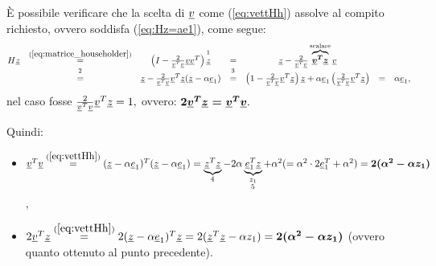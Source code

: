 È possibile verificare che la scelta di $\uline v$ come (\ref{eq:vettHh}) assolve al compito richiesto, ovvero soddisfa (\ref{eq:Hz=ae1}), come segue:
\begin{equation*}
    \begin{matrix}
        H\uline z &\overset{(\ref{eq:matrice_householder})}{=}&\left(I-\frac{2}{\uline v^T\uline v}\uline v\uline v^T\right)\overset{\footnotemark}{\uline z}&=&\uline z - \frac{2}{\uline v^T\uline v}\overbrace{\boldsymbol{\uline v^T\uline z}}^{\text{scalare}}\uline v\\
        &\overset{\footnotemark}{=}& \uline z - \frac{2}{\uline v^T\uline v}\uline v^T\uline z(\uline z - \alpha \uline e_1) &\overset{\footnotemark}{=}& \left(1 - \frac{2}{\uline v^T\uline v}\uline v^T\uline z \right)\uline z + \alpha \uline e_1\left(\frac{2}{\uline v^T\uline v}\uline v^T\uline z\right) &=& \alpha\uline e_1,
    \end{matrix}
\end{equation*}
nel caso fosse $\frac{2}{\uline v^T\uline v}\uline v^T\uline z=1,$ ovvero: $\boldsymbol{ 2\uline v^T\uline z = \uline v^T\uline v}.$

\addtocounter{footnote}{-2}



Quindi:
\begin{itemize}
    \item $\uline v^T\uline v \overset{(\ref{eq:vettHh})}{=}(\uline z -\alpha\uline e_1)^T(\uline z -\alpha\uline e_1)=\underbrace{\uline z^T\uline z}_{\footnotemark}-2\alpha\underbrace{\uline e_1^T\uline z}_{\underset{\footnotemark}{z_1}}+\alpha^2(=\alpha^2\cdot 2\uline e_1^T+\alpha^2)=\boldsymbol{2(\alpha^2-\alpha z_1)}$,
    \item $2\uline v^T\uline z\overset{(\ref{eq:vettHh})}{=} 2(\uline z - \alpha\uline e_1)^T\uline z = 2(\uline z^T \uline z - \alpha z_1) = \boldsymbol{2(\alpha^2-\alpha z_1)}$ (ovvero quanto ottenuto al punto precedente).
\end{itemize}

\addtocounter{footnote}{-1}


